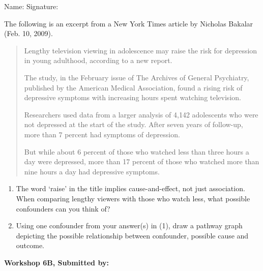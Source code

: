 \documentclass[11pt]{book}\usepackage[]{graphicx}\usepackage[]{color}
\begin{document}
\begin{exercises}
\begin{exercise}
\begin{center}
{{\vspace{4mm}
Name: \underline{\phantom{xxxxxxxxxxxxxxxxxxxxxxxx}} Signature: \underline{\phantom{xxxxxxxxxxxxxxxxxxxxxxxx}}
 }}
\end{center}

The following is an excerpt from a New York Times article by Nicholas Bakalar (Feb. 10, 2009).

\begin{quotation}
Lengthy television viewing in adolescence may raise the risk for depression in young adulthood, according to a new report.

The study, in the February issue of The Archives of General Psychiatry, published by the American Medical Association, found a rising risk of depressive symptoms with increasing hours spent watching television.

Researchers used data from a larger analysis of 4,142 adolescents who were not depressed at the start of the study. After seven years of follow-up, more than 7 percent had symptoms of depression.

But while about 6 percent of those who watched less than three hours a day were depressed, more than 17 percent of those who watched more than nine hours a day had depressive symptoms.
\end{quotation}

\begin{enumerate}
  \item The word `raise' in the title implies cause-and-effect, not just association.  When comparing lengthy viewers with those who watch less, what possible    confounders can you think of?
  \item Using one confounder from your answer(s) in (1), draw a pathway graph depicting the possible relationship between confounder, possible cause and outcome.
\end{enumerate}
\end{exercise}
\begin{solution}  %

\end{solution}

\clearpage

    \begin{exercise}  %

    \begin{center}
\begin{flushleft}\textbf{\large \hfill Workshop 6B, Submitted by: }\end{flushleft}


\end{center}
\end{exercise}
\end{exercises}
\end{document}
